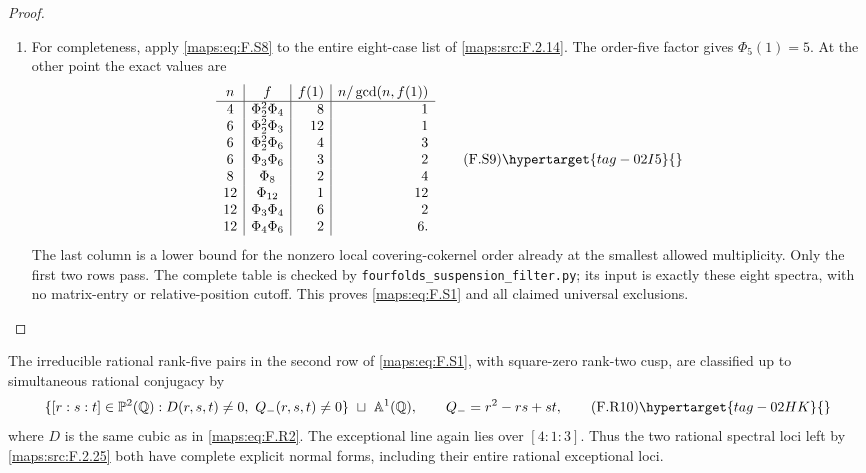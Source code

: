 \begin{proof}
\begin{enumerate}[label={$\langle1\rangle$\arabic*.}]
\item For completeness, apply \eqref{maps:eq:F.S8} to the entire eight-case
list of \ref{maps:src:F.2.14}.  The order-five factor gives $\Phi_5(1)=5$.
At the other point the exact values are
\[
\begin{array}{c|c|r|r}
 n&f&f(1)&n/\gcd(n,f(1))\\\hline
 4&\Phi_2^2\Phi_4&8&1\\
 6&\Phi_2^2\Phi_3&12&1\\
 6&\Phi_2^2\Phi_6&4&3\\
 6&\Phi_3\Phi_6&3&2\\
 8&\Phi_8&2&4\\
 12&\Phi_{12}&1&12\\
 12&\Phi_3\Phi_4&6&2\\
 12&\Phi_4\Phi_6&2&6.
\end{array}
 \tag{F.S9}\hypertarget{tag-02I5}{}\label{maps:eq:F.S9}
\]
The last column is a lower bound for the nonzero local
covering-cokernel order already at the smallest allowed
multiplicity.  Only the first two rows pass.
The complete table is checked by
\texttt{fourfolds\_suspension\_filter.py}; its input is
exactly these eight spectra, with no matrix-entry or
relative-position cutoff.  This proves \eqref{maps:eq:F.S1} and all
claimed universal exclusions.

\end{enumerate}
\end{proof}




\begin{theorem}\hypertarget{tag-02NG}{}\label{maps:src:F.2.26}


The irreducible rational rank-five pairs in the second row
of \eqref{maps:eq:F.S1}, with square-zero rank-two cusp, are classified
up to simultaneous rational conjugacy by
\[
 \{[r:s:t]\in\mathbb P^2(\mathbb Q):
             D(r,s,t)\ne0,\ Q_-(r,s,t)\ne0\}
       \ \sqcup\ \mathbb A^1(\mathbb Q),
 \qquad Q_-=r^2-rs+st,
 \tag{F.R10}\hypertarget{tag-02HK}{}\label{maps:eq:F.R10}
\]
where $D$ is the same cubic as in \eqref{maps:eq:F.R2}.
The exceptional line again lies over $[4:1:3]$.
Thus the two rational spectral loci left by \ref{maps:src:F.2.25} both
have complete explicit normal forms, including their
entire rational exceptional loci.

\end{theorem}


